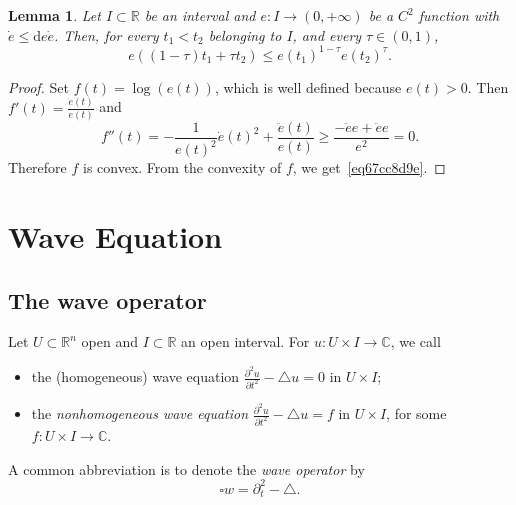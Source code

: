 \documentclass[a4paper,9pt]{amsart}
\newcommand{\R}{\mathbb{R}}	%
\newcommand{\C}{\mathbb{C}}	%
\newcommand{\dd}{\mathrm{d}}	%
\newcommand{\de}{\partial}		%
\newcommand{\laplacian}{\triangle}
\theoremstyle{plain}
\newtheorem{lemma}[proposition]{Lemma}
\theoremstyle{definition}
\theoremstyle{remark}
\begin{document}
\begin{lemma}\label{lem67cc8da8}
	Let $I\subset\R$ be an interval and $e:I\to (0,+\infty)$ be a $C^2$ function with 
	$\dot e \le \dd e \dot e$.
	Then, for every $t_1<t_2$ belonging to $I$, and every $\tau\in(0,1)$,
	\begin{equation}\label{eq67cc8d9e}
		e((1-\tau)t_1 + \tau t_2) \le e(t_1)^{1-\tau} e(t_2)^\tau .
	\end{equation}
\end{lemma}
\begin{proof}
	Set $f(t) = \log(e(t))$, which is well defined because $e(t)>0$.
	Then $f'(t) = \frac{\dot e(t)}{e(t)}$ and 
	\begin{equation}
		f''(t) = - \frac1{e(t)^2} \dot e(t)^2 + \frac{\ddot e(t)}{e(t)} 
	\ge \frac{ - \ddot e e + \ddot e e }{e^2} = 0 .
	\end{equation}
	Therefore $f$ is convex.
	From the convexity of $f$, we get~\eqref{eq67cc8d9e}.
\end{proof}













\newpage
\section{Wave Equation}

\subsection{The wave operator}\label{subs67cd41c5}
\newcommand{\waveop}{\square}

Let $U\subset\R^n$ open and $I\subset\R$ an open interval.
For $u:U\times I\to \C$, we call
\begin{itemize}
\item the (homogeneous) wave equation $\frac{\de^2u}{\de t^2} - \laplacian u = 0$ in $U\times I$;
\item the \emph{nonhomogeneous wave equation} $\frac{\de^2u}{\de t^2} - \laplacian u = f$ in $U\times I$, for some $f:U\times I\to\C$.
\end{itemize}
A common abbreviation is to denote the \emph{wave operator} by
\begin{equation}
	\waveop w = \de_t^2 - \laplacian .
\end{equation}
\end{document}
